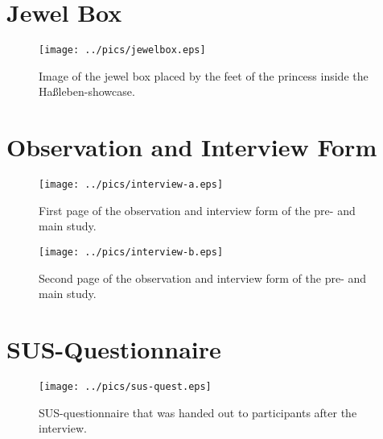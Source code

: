 \section{Jewel Box}
\label{appendix_box}
\phantom{a}
\begin{figure}[H]%
\centering
\texttt{[image: ../pics/jewelbox.eps]}%
\caption*{Image of the jewel box placed by the feet of the princess inside the Ha\ss leben-showcase.}%
\end{figure}

\newpage
\section{Observation and Interview Form}
\label{appendix_form}

\begin{figure}[H]%
\centering
\texttt{[image: ../pics/interview-a.eps]}%
\caption*{First page of the observation and interview form of the pre- and main study.}%
\end{figure}

\begin{figure}[H]%
\centering
\texttt{[image: ../pics/interview-b.eps]}%
\caption*{Second page of the observation and interview form of the pre- and main study.}%
\end{figure}

\newpage
\section{SUS-Questionnaire}
\label{appendix_sus}

\begin{figure}[H]%
\centering
	\texttt{[image: ../pics/sus-quest.eps]}%
	\caption*{SUS-questionnaire that was handed out to participants after the interview.}%
\end{figure}
